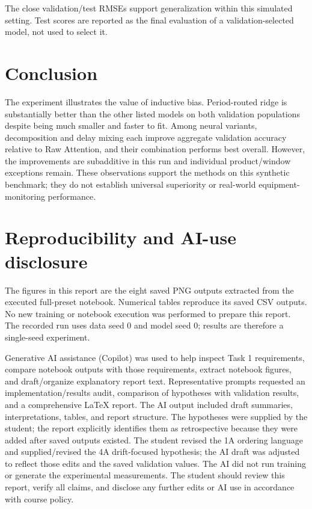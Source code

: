 \documentclass[11pt,a4paper]{article}
\begin{document}
The close validation/test RMSEs support generalization within this simulated setting. Test scores
are reported as the final evaluation of a validation-selected model, not used to select it.

\section{Conclusion}

The experiment illustrates the value of inductive bias. Period-routed ridge is substantially
better than the other listed models on both validation populations despite being much smaller and
faster to fit. Among neural variants, decomposition and delay mixing each improve aggregate
validation accuracy relative to Raw Attention, and their combination performs best overall.
However, the improvements are subadditive in this run and individual product/window exceptions
remain. These observations support the methods on this synthetic benchmark; they do not establish
universal superiority or real-world equipment-monitoring performance.

\section*{Reproducibility and AI-use disclosure}

The figures in this report are the eight saved PNG outputs extracted from the executed full-preset
notebook. Numerical tables reproduce its saved CSV outputs. No new training or notebook execution
was performed to prepare this report. The recorded run uses data seed 0 and model seed 0; results
are therefore a single-seed experiment.

Generative AI assistance (Copilot) was used to help inspect Task 1 requirements, compare notebook
outputs with those requirements, extract notebook figures, and draft/organize explanatory report
text. Representative prompts requested an implementation/results audit, comparison of hypotheses
with validation results, and a comprehensive LaTeX report. The AI output included draft summaries,
interpretations, tables, and report structure. The hypotheses were supplied by the student; the
report explicitly identifies them as retrospective because they were added after saved outputs
existed. The student revised the 1A ordering language and supplied/revised the 4A drift-focused
hypothesis; the AI draft was adjusted to reflect those edits and the saved validation values. The
AI did not run training or generate the experimental measurements. The student should review this
report, verify all claims, and disclose any further edits or AI use in accordance with course
policy.
\end{document}
